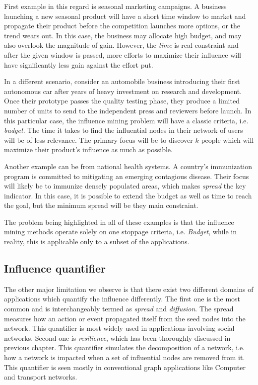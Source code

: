 		First example in this regard is seasonal marketing campaigns. A business launching a new seasonal product will have a short time window to market and propagate their product before the competition launches more options, or the trend wears out. In this case, the business may allocate high budget, and may also overlook the magnitude of gain. However, the \textit{time} is real constraint and after the given window is passed, more efforts to maximize their influence will have significantly less gain against the effort put.
		
		In a different scenario, consider an automobile business introducing their first autonomous car after years of heavy investment on research and development. Once their prototype passes the quality testing phase, they produce a limited number of units to send to the independent press and reviewers before launch. In this particular case, the influence mining problem will have a classic criteria, i.e. \textit{budget}. The time it takes to find the influential nodes in their network of users will be of less relevance. The primary focus will be to discover $k$ people which will maximize their product's influence as much as possible.
		
		Another example can be from national health systems. A country's immunization program is committed to mitigating an emerging contagious disease. Their focus will likely be to immunize densely populated areas, which makes \textit{spread} the key indicator. In this case, it is possible to extend the budget as well as time to reach the goal, but the minimum spread will be they main constraint.
		
		The problem being highlighted in all of these examples is that the influence mining methods operate solely on one stoppage criteria, i.e. \textit{Budget}, while in reality, this is applicable only to a subset of the applications.
		
		\subsection{Influence quantifier}
		\label{subsec:inf-framework-influence-quantifier}
		The other major limitation we observe is that there exist two different domains of applications which quantify the influence differently. The first one is the most common and is interchangeably termed as \textit{spread} and \textit{diffusion}. The spread measures how an action or event propagated itself from the seed nodes into the network. This quantifier is most widely used in applications involving social networks. Second one is \textit{resilience}, which has been thoroughly discussed in previous chapter. This quantifier simulates the decomposition of a network, i.e. how a network is impacted when a set of influential nodes are removed from it. This quantifier is seen mostly in conventional graph applications like Computer and transport networks.
		
